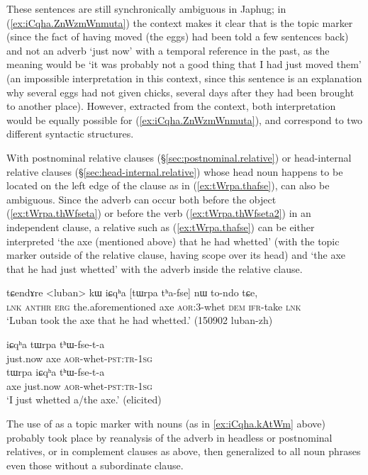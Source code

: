  These sentences are still synchronically ambiguous in Japhug; in  (\ref{ex:iCqha.ZnWzmWnmuta}) the context makes it clear that  is the topic marker (since the fact of having moved (the eggs) had been told a few sentences back) and not an adverb `just now' with a temporal reference in the past, as the meaning would be `it was probably not a good thing that I had just moved them' (an impossible interpretation in this context, since this sentence is an explanation why several eggs had not given chicks, several days after they had been brought to another place). However, extracted from the context, both interpretation would be equally possible for (\ref{ex:iCqha.ZnWzmWnmuta}), and correspond to two different syntactic structures.

With postnominal relative clauses (§\ref{sec:postnominal.relative}) or head-internal relative clauses (§\ref{sec:head-internal.relative}) whose head noun happens to be located on the left edge of the clause as in (\ref{ex:tWrpa.thafse}),  can also be ambiguous. Since the adverb  can occur both before the object (\ref{ex:tWrpa.thWfseta}) or before the verb (\ref{ex:tWrpa.thWfseta2}) in an independent clause, a relative such as (\ref{ex:tWrpa.thafse}) can be either interpreted `the axe (mentioned above) that he had whetted' (with the topic marker  outside of the relative clause, having scope over its head) and `the axe that he had just whetted' with the adverb  inside the relative clause.

 \begin{exe}
\ex \label{ex:tWrpa.thafse}
 \gll  tɕendɤre <luban> kɯ iɕqʰa [tɯrpa tʰa-fse] nɯ to-ndo tɕe, \\
 \textsc{lnk}  \textsc{anthr} \textsc{erg} the.aforementioned axe \textsc{aor}:3\flobv{}-whet \textsc{dem} \textsc{ifr}-take \textsc{lnk} \\
 \glt `Luban took the axe that he had whetted.' (150902 luban-zh)
 \end{exe}

  \begin{exe}
  \ex 
  \begin{xlist}
\ex \label{ex:tWrpa.thWfseta}
 \gll   iɕqʰa tɯrpa tʰɯ-fse-t-a \\
just.now axe \textsc{aor}-whet-\textsc{pst}:\textsc{tr}-\textsc{1sg} \\
\ex \label{ex:tWrpa.thWfseta2}
 \gll   tɯrpa  iɕqʰa tʰɯ-fse-t-a \\
 axe just.now \textsc{aor}-whet-\textsc{pst}:\textsc{tr}-\textsc{1sg} \\
 \glt `I just whetted a/the axe.' (elicited)
 \end{xlist}
 \end{exe}
  
The use of  as a topic marker with nouns (as in \ref{ex:iCqha.kAtWm} above) probably took place by reanalysis of the adverb in headless or postnominal relatives, or in complement clauses as above, then generalized to all noun phrases even those without a subordinate clause.

